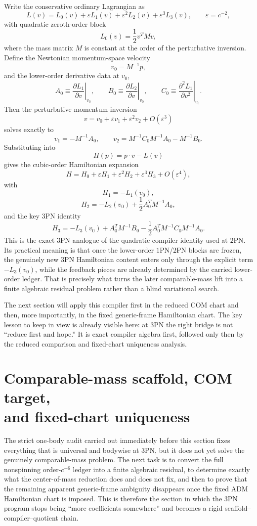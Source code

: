 \documentclass[11pt]{article}
\begin{document}
Write the conservative ordinary Lagrangian as
\[
L(v)=L_0(v)+\varepsilon L_1(v)+\varepsilon^2L_2(v)+\varepsilon^3L_3(v),
\qquad
\varepsilon=c^{-2},
\]
with quadratic zeroth-order block
\[
L_0(v)=\frac12 v^T M v,
\]
where the mass matrix $M$ is constant at the order of the perturbative
inversion.  Define the Newtonian momentum-space velocity
\[
v_0=M^{-1}p,
\]
and the lower-order derivative data at $v_0$,
\[
A_0\equiv \left.\frac{\partial L_1}{\partial v}\right|_{v_0},
\qquad
B_0\equiv \left.\frac{\partial L_2}{\partial v}\right|_{v_0},
\qquad
C_0\equiv \left.\frac{\partial^2L_1}{\partial v^2}\right|_{v_0}.
\]
Then the perturbative momentum inversion
\[
v=v_0+\varepsilon v_1+\varepsilon^2v_2+O(\varepsilon^3)
\]
solves exactly to
\[
v_1=-M^{-1}A_0,
\qquad
v_2=M^{-1}C_0M^{-1}A_0-M^{-1}B_0.
\]
Substituting into
\[
H(p)=p\cdot v-L(v)
\]
gives the cubic-order Hamiltonian expansion
\[
H=H_0+\varepsilon H_1+\varepsilon^2H_2+\varepsilon^3H_3+O(\varepsilon^4),
\]
with
\[
H_1=-L_1(v_0),
\]
\[
H_2=-L_2(v_0)+\frac12A_0^TM^{-1}A_0,
\]
and the key $3$PN identity
\[
\boxed{
H_3=-L_3(v_0)+A_0^TM^{-1}B_0-
\frac12A_0^TM^{-1}C_0M^{-1}A_0.
}
\]
This is the exact $3$PN analogue of the quadratic compiler identity used at
$2$PN.  Its practical meaning is that once the lower-order $1$PN/$2$PN blocks
are frozen, the genuinely new $3$PN Hamiltonian content enters only through the
explicit term $-L_3(v_0)$, while the feedback pieces are already determined by
the carried lower-order ledger.  That is precisely what turns the later
comparable-mass lift into a finite algebraic residual problem rather than a
blind variational search.

The next section will apply this compiler first in the reduced COM chart and
then, more importantly, in the fixed generic-frame Hamiltonian chart.  The key
lesson to keep in view is already visible here: at $3$PN the right bridge is not
``reduce first and hope.''  It is exact compiler algebra first, followed only
then by the reduced comparison and fixed-chart uniqueness analysis.


\section[Comparable-mass scaffold, COM target, and fixed-chart uniqueness]{Comparable-mass scaffold, COM target,\\ and fixed-chart uniqueness}
\label{sec:compmass}

The strict one-body audit carried out immediately before this section fixes everything that is
universal and bodywise at $3$PN, but it does not yet solve the genuinely
comparable-mass problem.  The next task is to convert the full nonspinning
order-$c^{-6}$ ledger into a finite algebraic residual, to determine exactly
what the center-of-mass reduction does and does not fix, and then to prove that
the remaining apparent generic-frame ambiguity disappears once the fixed ADM
Hamiltonian chart is imposed.  This is therefore the section in which the $3$PN
program stops being ``more coefficients somewhere'' and becomes a rigid
scaffold--compiler--quotient chain.
\end{document}
